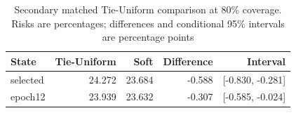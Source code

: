 \begin{table}[t]
\caption{Secondary matched Tie-Uniform comparison at 80\% coverage. Risks are percentages; differences and conditional 95\% intervals are percentage points}\label{tab:tieuniform}
\centering\begin{tabular}{lrrrr}\toprule
State & Tie-Uniform & Soft & Difference & Interval\\\midrule
selected & 24.272 & 23.684 & -0.588 & [-0.830, -0.281]\\
epoch12 & 23.939 & 23.632 & -0.307 & [-0.585, -0.024]\\
\bottomrule\end{tabular}

\end{table}
